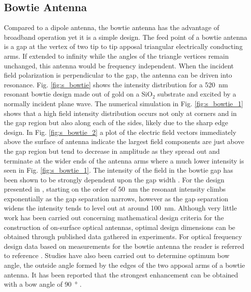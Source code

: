 \documentclass[11pt]{article}
\begin{document}
\subsection{Bowtie Antenna}
%
Compared to a dipole antenna, the bowtie antenna has the advantage of broadband operation yet it is a simple design. The feed point of a bowtie antenna is a gap at the vertex of two tip to tip apposal triangular electrically conducting arms. If extended to infinity while the angles of the triangle vertices remain unchanged, this antenna would be frequency independent. When the incident field polarization is perpendicular to the gap, the antenna can be driven into resonance. Fig. \ref{fig:s_bowtie} shows the intensity distribution for a \SI{520}{\nano\metre} resonant bowtie design made out of gold on a $\text{SiO}_2$ substrate and excited by a normally incident plane wave. The numerical simulation in Fig. \ref{fig:s_bowtie_1} shows that a high field intensity distribution occurs not only at corners and in the gap region but also along each of the sides, likely due to the sharp edge design. In Fig. \ref{fig:s_bowtie_2} a plot of the electric field vectors immediately above the surface of antenna indicate the largest field components are just above the gap region but tend to decrease in amplitude as they spread out and terminate at the wider ends of the antenna arms where a much lower intensity is seen in Fig.
\ref{fig:s_bowtie_1}. The intensity of the field in the bowtie gap has been shown
to be strongly dependent upon the gap width \cite{Schuck2005}. For the design presented in \cite{Schuck2005}, starting on the order of \SI{50}{\nano\metre} the resonant intensity climbs exponentially as the gap separation narrows, however as the gap separation widens the intensity tends to level out at around \SI{100}{\nano\metre}. Although very little work has been carried out concerning mathematical design criteria for the construction of on-surface optical antennas, optimal design dimensions can be obtained through published data gathered in experiments. For optical frequency design data based on measurements for the bowtie antenna the reader is referred to reference \cite{Fischer2008}. Studies have also been carried out to determine optimum bow angle, the outside angle formed by the edges of the two apposal arms of a bowtie antenna. It has been reported that the strongest enhancement can be obtained with a bow angle of \SI{90}{\degree} \cite{Fischer2008}.
%
\end{document}
